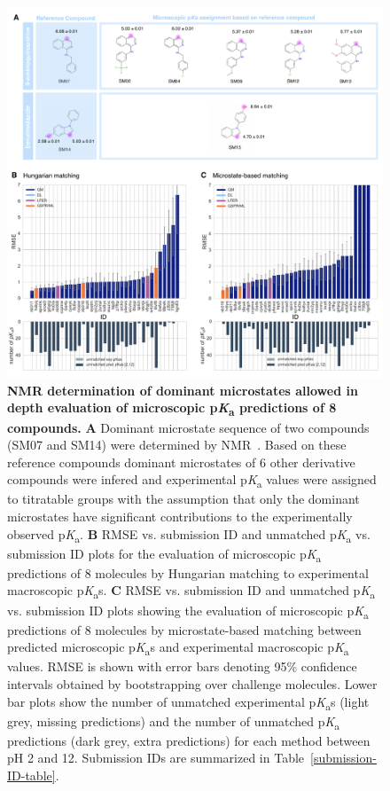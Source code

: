 \documentclass[9pt,lineno,final]{elife}
\newcommand{\pKa}{p\textit{K}\textsubscript{a}}
\begin{document}
\begin{figure}
\centering
\includegraphics[width=1.0\linewidth]{figures/typeI_8_mol_matching_comparison.pdf}
\caption{{\bf NMR determination of dominant microstates allowed in depth evaluation of microscopic \pKa{} predictions of 8 compounds.} 
{\bf A} Dominant microstate sequence of two compounds (SM07 and SM14) were determined by NMR~\cite{Isik:2018:J.Comput.AidedMol.Des.}. Based on these reference compounds dominant microstates of 6 other derivative compounds were infered and experimental \pKa{} values were assigned to titratable groups with the assumption that only the dominant microstates have significant contributions to the experimentally observed \pKa{}.
{\bf B} RMSE vs. submission ID and unmatched \pKa{} vs. submission ID plots for the evaluation of microscopic \pKa{} predictions of 8 molecules by Hungarian matching to experimental macroscopic \pKa{}s. {\bf C} RMSE vs. submission ID and unmatched \pKa{} vs. submission ID plots showing the evaluation of microscopic \pKa{} predictions of 8 molecules by microstate-based matching between predicted microscopic \pKa{}s and experimental macroscopic \pKa{} values. 
RMSE is shown with error bars denoting 95\% confidence intervals obtained by bootstrapping over challenge molecules. Lower bar plots show the number of unmatched experimental \pKa{}s (light grey, missing predictions) and the number of unmatched \pKa{} predictions (dark grey, extra predictions) for each method between pH 2 and 12. Submission IDs are summarized in Table~\ref{submission-ID-table}. 
}
\label{fig:typeI-matching-algorithm-comparison}
\end{figure}
\end{document}
